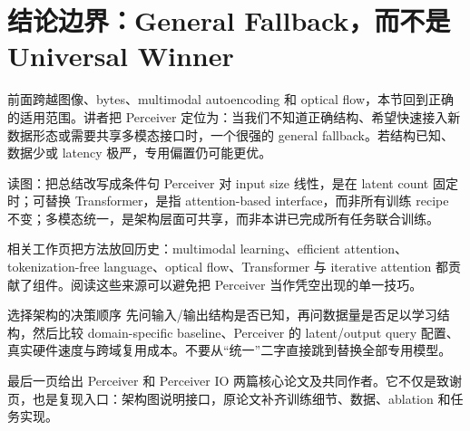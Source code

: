 \section{结论边界：General Fallback，而不是 Universal Winner}

前面跨越图像、bytes、multimodal autoencoding 和 optical flow，本节回到正确的适用范围。讲者把 Perceiver 定位为：当我们不知道正确结构、希望快速接入新数据形态或需要共享多模态接口时，一个很强的 general fallback。若结构已知、数据少或 latency 极严，专用偏置仍可能更优。


\begin{knowledgebox}{读图：把总结改写成条件句}
Perceiver 对 input size 线性，是在 latent count 固定时；可替换 Transformer，是指 attention-based interface，而非所有训练 recipe 不变；多模态统一，是架构层面可共享，而非本讲已完成所有任务联合训练。
\end{knowledgebox}


相关工作页把方法放回历史：multimodal learning、efficient attention、tokenization-free language、optical flow、Transformer 与 iterative attention 都贡献了组件。阅读这些来源可以避免把 Perceiver 当作凭空出现的单一技巧。


\begin{importantbox}{选择架构的决策顺序}
先问输入/输出结构是否已知，再问数据量是否足以学习结构，然后比较 domain-specific baseline、Perceiver 的 latent/output query 配置、真实硬件速度与跨域复用成本。不要从“统一”二字直接跳到替换全部专用模型。
\end{importantbox}

最后一页给出 Perceiver 和 Perceiver IO 两篇核心论文及共同作者。它不仅是致谢页，也是复现入口：架构图说明接口，原论文补齐训练细节、数据、ablation 和任务实现。


